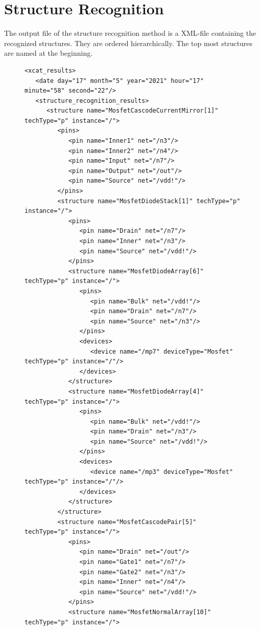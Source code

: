 \section{Structure Recognition}\label{sec:OutputFileStructRec}
The output file of the structure recognition method is a XML-file containing the recognized structures. They are ordered hierarchically. The top most structures are named at the beginning.

\begin{figure}[H]
	\begin{lstlisting}[basicstyle=\ttfamily\scriptsize,backgroundcolor={\color{gray!30}}, escapechar=? ]
<xcat_results>
   <date day="17" month="5" year="2021" hour="17" minute="58" second="22"/>
   <structure_recognition_results>
      <structure name="MosfetCascodeCurrentMirror[1]" techType="p" instance="/">
         <pins>
            <pin name="Inner1" net="/n3"/>
            <pin name="Inner2" net="/n4"/>
            <pin name="Input" net="/n7"/>
            <pin name="Output" net="/out"/>
            <pin name="Source" net="/vdd!"/>
         </pins>
         <structure name="MosfetDiodeStack[1]" techType="p" instance="/">
            <pins>
               <pin name="Drain" net="/n7"/>
               <pin name="Inner" net="/n3"/>
               <pin name="Source" net="/vdd!"/>
            </pins>
            <structure name="MosfetDiodeArray[6]" techType="p" instance="/">
               <pins>
                  <pin name="Bulk" net="/vdd!"/>
                  <pin name="Drain" net="/n7"/>
                  <pin name="Source" net="/n3"/>
               </pins>
               <devices>
                  <device name="/mp7" deviceType="Mosfet" techType="p" instance="/"/>
               </devices>
            </structure>
            <structure name="MosfetDiodeArray[4]" techType="p" instance="/">
               <pins>
                  <pin name="Bulk" net="/vdd!"/>
                  <pin name="Drain" net="/n3"/>
                  <pin name="Source" net="/vdd!"/>
               </pins>
               <devices>
                  <device name="/mp3" deviceType="Mosfet" techType="p" instance="/"/>
               </devices>
            </structure>
         </structure>
         <structure name="MosfetCascodePair[5]" techType="p" instance="/">
            <pins>
               <pin name="Drain" net="/out"/>
               <pin name="Gate1" net="/n7"/>
               <pin name="Gate2" net="/n3"/>
               <pin name="Inner" net="/n4"/>
               <pin name="Source" net="/vdd!"/>
            </pins>
            <structure name="MosfetNormalArray[10]" techType="p" instance="/">

\end{lstlisting}
\end{figure}
